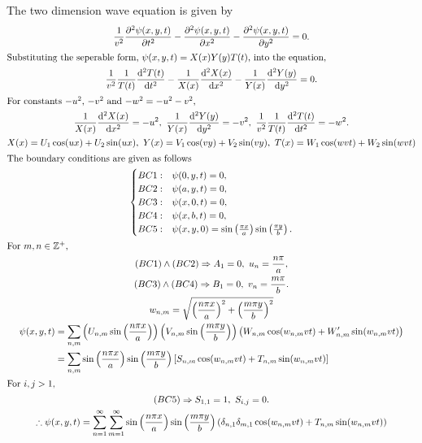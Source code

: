 \documentclass[12pt]{article}
\newcommand*\diff{\mathop{}\!\mathrm{d}}
\newenvironment{problem}[2][Problem]{\begin{trivlist}
\item[\hskip \labelsep {\bfseries #1}\hskip \labelsep {\bfseries #2.}]}{\end{trivlist}}
\begin{document}
\begin{problem}{3}
\end{problem}
The two dimension wave equation is given by
\begin{gather*}
	\frac{1}{v^2} \frac{\partial^2 \psi(x,y,t)}{\partial t^2}
		- \frac{\partial^2 \psi(x,y,t)}{\partial x^2}
		- \frac{\partial^2 \psi(x,y,t)}{\partial y^2}
		= 0. \\
	\intertext{Substituting the seperable form, $\psi(x,y,t) = X(x)Y(y)T(t)$, into the
	equation,}
	\frac{1}{v^2} \frac{1}{T(t)} \frac{\diff^2 T(t)}{\diff t^2}
		- \frac{1}{X(x)} \frac{\diff^2 X(x)}{\diff x^2}
		- \frac{1}{Y(x)} \frac{\diff^2 Y(y)}{\diff y^2}
		= 0. \\
	\intertext{For constants $-u^2$, $-v^2$ and $-w^2 = -u^2 - v^2$,}
	\frac{1}{X(x)} \frac{\diff^2 X(x)}{\diff x^2} = -u^2,\
	\frac{1}{Y(x)} \frac{\diff^2 Y(y)}{\diff y^2} = -v^2,\
	\frac{1}{v^2} \frac{1}{T(t)} \frac{\diff^2 T(t)}{\diff t^2} = -w^2. \\
	X(x) = U_1 \cos (ux) + U_2 \sin(ux),\
	Y(x) = V_1 \cos (vy) + V_2 \sin(vy),\
	T(x) = W_1 \cos (wvt) + W_2 \sin(wvt) \\
	\intertext{The boundary conditions are given as follows}
	\begin{cases}
		BC1: & \psi(0,y,t) = 0, \\
		BC2: & \psi(a,y,t) = 0, \\
		BC3: & \psi(x,0,t) = 0, \\
		BC4: & \psi(x,b,t) = 0, \\
		BC5: & \psi(x,y,0) = 
			\sin\left( \frac{\pi x}{a} \right)
			\sin\left( \frac{\pi y}{b} \right). \\
	\end{cases} \\
	\intertext{For $m, n \in \mathbb{Z}^+$,}
	(BC1) \land (BC2) \Rightarrow A_1 = 0,\ u_n = \frac{n\pi}{a}, \\
	(BC3) \land (BC4) \Rightarrow B_1 = 0,\ v_n = \frac{m\pi}{b}. \\
	w_{n,m} = \sqrt{
		\left( \frac{n\pi x}{a} \right)^2
		+ \left( \frac{m\pi y}{b} \right)^2
	} \\
	\begin{aligned}
		\psi(x,y,t) &= 
			\sum_{n,m} \left( 
				U_{n,m} \sin \left( \frac{n\pi x}{a} \right)
			\right) 
			\left( 
				V_{n,m} \sin \left( \frac{m\pi y}{b} \right)
			\right) 
			\left( 
				W_{n,m} \cos (w_{n,m}vt) + W_{n,m}' \sin(w_{n,m}vt)
			\right) \\
		&= \sum_{n,m} 
			\sin \left( \frac{n\pi x}{a} \right)
			\sin \left( \frac{m\pi y}{b} \right)
			\left[ 
				S_{n,m} \cos (w_{n,m}vt) + T_{n,m} \sin(w_{n,m}vt)
			\right] \\
	\end{aligned}
	\\
	\intertext{For $i, j > 1$,}
	(BC5) \Rightarrow S_{1,1} = 1,\ S_{i,j} = 0. \\
	\therefore \psi(x,y,t) = 
			\sum_{n=1}^\infty \sum_{m=1}^\infty
			\sin \left( \frac{n\pi x}{a} \right)
			\sin \left( \frac{m\pi y}{b} \right)
			\left( 
				\delta_{n,1} \delta_{m,1} \cos (w_{n,m}vt) + T_{n,m} \sin(w_{n,m}vt)
			\right) \\
\end{gather*}
\end{document}
